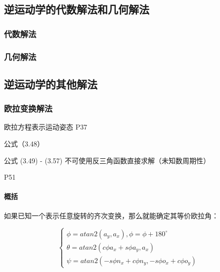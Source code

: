 \documentclass[11pt]{book}
\begin{document}
    \subsection{逆运动学的代数解法和几何解法}
    
    \subsubsection{代数解法}


    \subsubsection{几何解法}

    \subsection{逆运动学的其他解法}

    \subsubsection{欧拉变换解法}

    欧拉方程表示运动姿态 P37

    公式（3.48）

    公式 (3.49) - (3.57) 
    不可使用反三角函数直接求解（未知数周期性）

    P51

    \paragraph{概括}

    如果已知一个表示任意旋转的齐次变换，那么就能确定其等价欧拉角：

    \begin{equation}
        \left\{
            \begin{array}{ll}
               \phi = atan2(a_y, a_x), \phi = \phi + 180 ^ \circ \\
               \theta = atan2(c\phi a_x + s \phi a_y, a_x) \\
               \psi = atan2(-s \phi n_x + c \phi n_y, -s \phi o_x + c \phi o_y)
            \end{array}
        \right.
    \end{equation}
\end{document}
